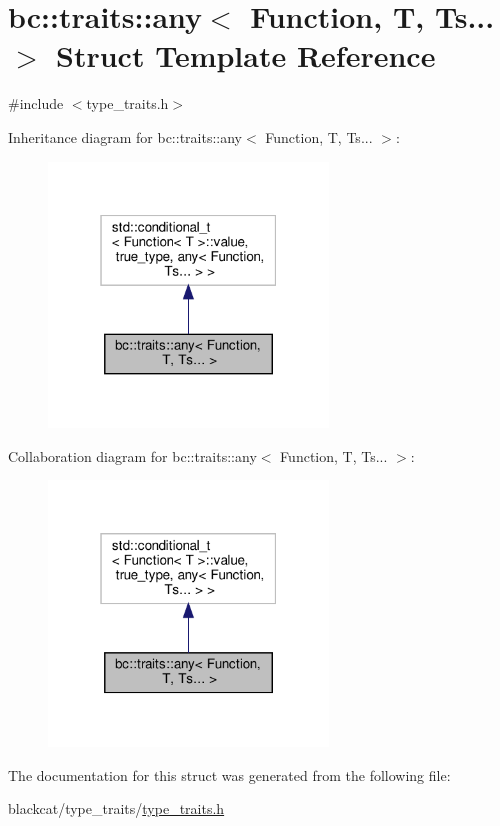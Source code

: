 \hypertarget{structbc_1_1traits_1_1any_3_01Function_00_01T_00_01Ts_8_8_8_01_4}{}\section{bc\+:\+:traits\+:\+:any$<$ Function, T, Ts... $>$ Struct Template Reference}
\label{structbc_1_1traits_1_1any_3_01Function_00_01T_00_01Ts_8_8_8_01_4}


{\ttfamily \#include $<$type\+\_\+traits.\+h$>$}



Inheritance diagram for bc\+:\+:traits\+:\+:any$<$ Function, T, Ts... $>$\+:\nopagebreak
\begin{figure}[H]
\begin{center}
\leavevmode
\includegraphics[width=211pt]{structbc_1_1traits_1_1any_3_01Function_00_01T_00_01Ts_8_8_8_01_4__inherit__graph}
\end{center}
\end{figure}


Collaboration diagram for bc\+:\+:traits\+:\+:any$<$ Function, T, Ts... $>$\+:\nopagebreak
\begin{figure}[H]
\begin{center}
\leavevmode
\includegraphics[width=211pt]{structbc_1_1traits_1_1any_3_01Function_00_01T_00_01Ts_8_8_8_01_4__coll__graph}
\end{center}
\end{figure}


The documentation for this struct was generated from the following file\+:\begin{DoxyCompactItemize}
\item 
blackcat/type\+\_\+traits/\hyperlink{type__traits_2type__traits_8h}{type\+\_\+traits.\+h}\end{DoxyCompactItemize}
